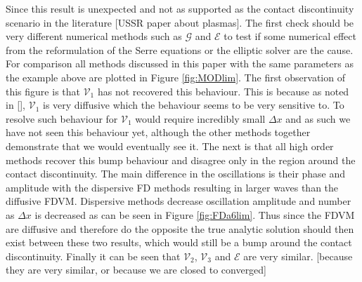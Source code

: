 \documentclass[SingleSpace,12pt,Journal]{Serre_ASCE}
\begin{document}
Since this result is unexpected and not as supported as the contact discontinuity scenario in the literature \cite{El-etal-2006} [USSR paper about plasmas]. The first check should be very different numerical methods such as $\mathcal{G}$ and $\mathcal{E}$ to test if some numerical effect from the reformulation of the Serre equations or the elliptic solver are the cause. For comparison all methods discussed in this paper with the same parameters as the example above are plotted in Figure \ref{fig:MODlim}. The first observation of this figure is that $\mathcal{V}_1$ has not recovered this behaviour. This is because as noted in [], $\mathcal{V}_1$ is very diffusive which the behaviour seems to be very sensitive to. To resolve such behaviour for $\mathcal{V}_1$ would require incredibly small $\Delta x$ and as such we have not seen this behaviour yet, although the other methods together demonstrate that we would eventually see it. The next is that all high order methods recover this bump behaviour and disagree only in the region around the contact discontinuity. The main difference in the oscillations is their phase and amplitude with the dispersive FD methods resulting in larger waves than the diffusive FDVM. Dispersive methods decrease oscillation amplitude and number as $\Delta x$ is decreased as can be seen in Figure \ref{fig:FDa6lim}. Thus since the FDVM are diffusive and therefore do the opposite the true analytic solution should then exist between these two results, which would still be a bump around the contact discontinuity. Finally it can be seen that $\mathcal{V}_2$, $\mathcal{V}_3$ and $\mathcal{E}$ are very similar. [because they are very similar, or because we are closed to converged]
\end{document}
